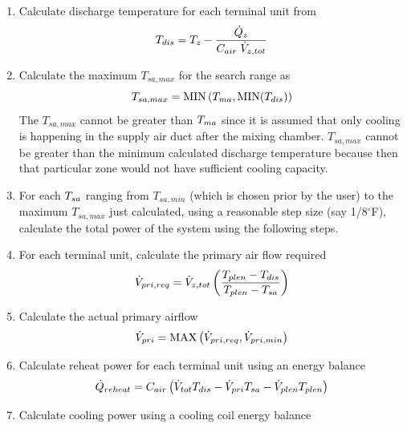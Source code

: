 \begin{enumerate}
    \item Calculate discharge temperature for each terminal unit from 
        \begin{equation}
            T_{dis}=T_{z} - \frac{\dot{Q}_{z}}{C_{air} \; \dot{V}_{z,tot}  }   
        \end{equation}
    \item Calculate the maximum \(T_{sa,max}\) for the search range as 
        \begin{equation}
            T_{sa,max}  = \text{MIN}\left(T_{ma}{}, \text{MIN}(T_{dis}) \right)
        \end{equation}
        The \(T_{sa,max}\) cannot be greater than \(T_{ma}{}\) since it is
        assumed that only cooling is happening in the supply air duct
        after the mixing chamber. \(T_{sa,max}\) cannot be greater than
        the minimum calculated discharge temperature because then that
        particular zone would not have sufficient cooling capacity. 
    \item For each \(T_{sa}{}\) ranging from \(T_{sa,min}\) (which is
        chosen prior by the user) to the maximum \(T_{sa,max}\) just
        calculated, using a reasonable step size (say 1/8\(^{\circ}\)F),
        calculate the total power of the system using the following
        steps.
    \item For each terminal unit, calculate the primary air flow required
    \begin{equation} \dot{V}_{pri, req} = \dot{V}_{z,tot} \left( \frac{T_{plen} - T_{dis} }{T_{plen} - T_{sa}} \right) \end{equation}
    \item Calculate the actual primary airflow
        \begin{equation}\label{eq:PrimaryFlowRequired}
            \dot{V}_{pri} = \text{MAX}\left(\dot{V}_{pri,req}, \dot{V}_{pri,min}  \right)
        \end{equation}
    \item Calculate reheat power for each terminal unit using an energy balance
        \begin{equation}\label{eq:reheatPerZone}
            \dot{Q}_{reheat} = C_{air} \left(\dot{V}_{tot} T_{dis} -
            \dot{V}_{pri} T_{sa}{} - \dot{V}_{plen} T_{plen}\right)  
        \end{equation}
    \item Calculate cooling power using a cooling coil energy balance
        \begin{equation}\label{eq:TotalCoolingPower}

\end{equation}
\end{enumerate}
